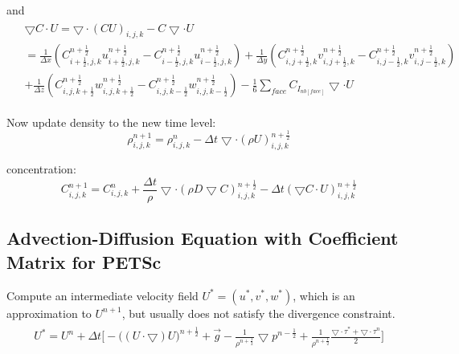 \documentclass{article}
\numberwithin{equation}{subsection}
\begin{document}
and
\begin{align}
\begin{split}
& \bigtriangledown C \cdot U = \bigtriangledown \cdot(CU)_{i,j,k} - C\bigtriangledown \cdot U \\
& = \frac{1}{\Delta x}(C^{n+\frac{1}{2}}_{i+\frac{1}{2},j,k}u^{n+\frac{1}{2}}_{i+\frac{1}{2},j,k} - C^{n+\frac{1}{2}}_{i-\frac{1}{2},j,k}u^{n+\frac{1}{2}}_{i-\frac{1}{2},j,k}) + \frac{1}{\Delta y}(C^{n+\frac{1}{2}}_{i,j+\frac{1}{2},k}v^{n+\frac{1}{2}}_{i,j+\frac{1}{2},k} - C^{n+\frac{1}{2}}_{i,j-\frac{1}{2},k}v^{n+\frac{1}{2}}_{i,j-\frac{1}{2},k}) \\
& + \frac{1}{\Delta z}(C^{n+\frac{1}{2}}_{i,j,k+\frac{1}{2}}w^{n+\frac{1}{2}}_{i,j,k+\frac{1}{2}} - C^{n+\frac{1}{2}}_{i,j,k-\frac{1}{2}}w^{n+\frac{1}{2}}_{i,j,k-\frac{1}{2}}) - \frac{1}{6}\sum_{face} C_{I_{nb[face]}} \bigtriangledown \cdot U
\end{split}
\end{align}


Now update density to the new time level:
\begin{equation}
\rho^{n+1}_{i,j,k} = \rho^n_{i,j,k} - \Delta t \bigtriangledown \cdot(\rho U)^{n+\frac{1}{2}}_{i,j,k}
\end{equation}

concentration:
\begin{equation}
C^{n+1}_{i,j,k} = C^n_{i,j,k} + \frac{\Delta t}{\rho}\bigtriangledown \cdot (\rho D \bigtriangledown C)^{n+\frac{1}{2}}_{i,j,k} - \Delta t (\bigtriangledown C \cdot U)^{n+\frac{1}{2}}_{i,j,k}
\end{equation}



\subsection{Advection-Diffusion Equation with Coefficient Matrix for PETSc}
Compute an intermediate velocity field $U^* = (u^*, v^*, w^*)$, which is an approximation to $U^{n+1}$, but usually does not satisfy the divergence constraint.
\begin{align}
\begin{split}
U^{*} = U^n + \Delta t \Bigg[ -\Big( (U \cdot \bigtriangledown) U\Big)^{n+\frac{1}{2}} + \vec{g} 
-\frac{1}{\rho^{n+\frac{1}{2}}} \bigtriangledown p^{n-\frac{1}{2}} + \frac{1}{\rho^{n+\frac{1}{2}}} \frac{\bigtriangledown \cdot \tau^{*} + \bigtriangledown \cdot \tau^{n}}{2} \Bigg]
\end{split}
\end{align}
\end{document}
